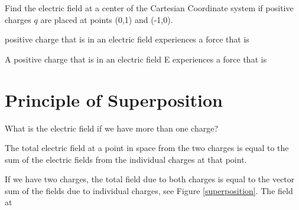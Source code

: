 \documentclass{ximera}
\begin{document}
\begin{problem}
   Find the electric field at a center of the Cartesian Coordinate system if positive charges $q$ are placed at points (0,1) and (-1,0).
   \begin{prompt}
   \begin{multipleChoice}
   \end{multipleChoice}
   \end{prompt}
   \end{problem}


 positive charge that is in an electric field  experiences a force that is



\begin{problem}
   A positive charge that is in an electric field E  experiences a force that is
   \begin{prompt}
   \begin{multipleChoice}
   \end{multipleChoice}
   \end{prompt}
   \end{problem}
   
   
\section{Principle of Superposition}




What is the electric field if we have more than one charge?

The total electric field at a point in space from the two charges is equal to the sum of the electric fields from the individual charges at that point.

If we have two charges, the total field due to both charges is equal to the vector sum of the fields due to individual charges, see Figure \ref{superposition}.  The field at
\end{document}
